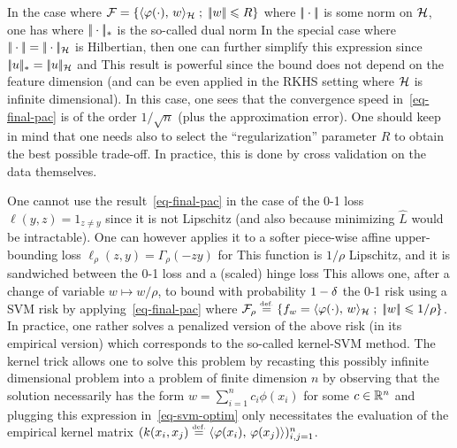 \begin{exmp}
	In the case where $\mathcal{F} = \left\{  \langle \varphi(\cdot),\,w\rangle_{\mathcal{H}}  \;;\;  |\!| w |\!| \leqslant R \right\}$
	where $|\!| \cdot |\!|$ is some norm on $\mathcal{H}$, one has
	where $|\!| \cdot |\!|_*$ is the so-called dual norm
	In the special case where $|\!| \cdot |\!|=|\!| \cdot |\!|_{\mathcal{H}}$ is Hilbertian, then one can further simplify this expression since
	$|\!| u |\!|_* = |\!| u |\!|_{\mathcal{H}}$ and
	This result is powerful since the bound does not depend on the feature dimension (and can be even applied in the RKHS setting where $\mathcal{H}$ is infinite dimensional).
	In this case, one sees that  the convergence speed in~\eqref{eq-final-pac} is of the order $1/\sqrt{n}$ (plus the approximation error).
	One should keep in mind that one needs also to select the ``regularization'' parameter $R$ to obtain the best possible trade-off. In practice, this is done by cross validation on the data themselves.  
\end{exmp}

\begin{exmp}
	One cannot use the result~\eqref{eq-final-pac} in the case of the 0-1 loss $\ell(y,z)=1_{z \neq y}$ since it is not Lipschitz (and also because minimizing $\hat L$ would be intractable). One can however applies it to a softer piece-wise affine upper-bounding loss $\ell_\rho(z,y)=\Gamma_\rho(-zy)$ for 
	This function is $1/\rho$ Lipschitz, and it is sandwiched between the 0-1 loss and a (scaled) hinge loss 
	This allows one, after a change of variable $w \mapsto w/\rho$, to bound with probability $1-\delta$ the 0-1 risk using a SVM risk by applying~\eqref{eq-final-pac}
	where $\mathcal{F}_\rho \stackrel{\mbox{\upshape\tiny def.}}{=} \left\{  f_w = \langle \varphi(\cdot),\,w\rangle_{\mathcal{H}}  \;;\;  |\!| w |\!| \leqslant 1/\rho \right\}$.
	In practice, one rather solves a penalized version of the above  risk (in its empirical version)
	which corresponds to the so-called kernel-SVM method.
	The kernel trick allows one to solve this problem by recasting this possibly infinite dimensional problem into a problem of finite dimension $n$ by observing that the solution necessarily has the form 
	$w = \sum_{i=1}^n c_i \phi(x_i)$ for some $c \in \mathbb{R}^n$ and
	plugging this expression in~\eqref{eq-svm-optim} only necessitates the evaluation of the empirical kernel matrix $( k(x_i,x_j)\stackrel{\mbox{\upshape\tiny def.}}{=} \langle \varphi(x_i),\,\varphi(x_j)\rangle )_{i,j=1}^n$.
\end{exmp} 